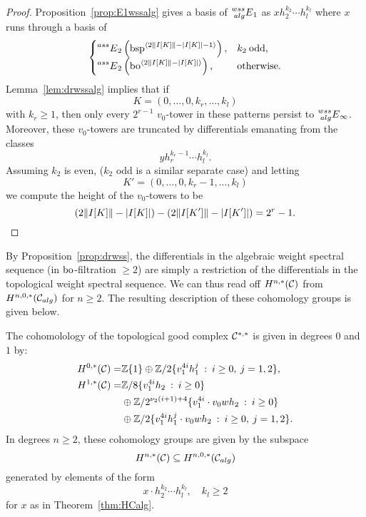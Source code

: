 {\begin{proof}
Proposition~\ref{prop:E1wssalg} gives a basis of $\prescript{wss}{alg}{E}_1$ as
$ xh_2^{k_2} \cdots h_l^{k_l} $
where $x$ runs through a basis of
$$
\begin{cases}
\prescript{ass}{}{E}_2\left(\mathrm{bsp}^{\langle 2\lVert I[K] \rVert-\lvert I[K] \rvert-1 \rangle}\right), &  k_2 \: \mathrm{odd}, \\
\prescript{ass}{}{E}_2\left( \mathrm{bo}^{\langle 2\lVert I[K] \rVert-\lvert I[K] \rvert \rangle} \right), & \mathrm{otherwise}.
\end{cases}
$$
Lemma~\ref{lem:drwssalg} implies that if 
$$ K = (0, \ldots, 0, k_r, \ldots, k_l) $$
with $k_r \ge 1$, then only every $2^{r-1}$ $v_0$-tower
in these patterns persist to $\prescript{wss}{alg}{E}_\infty$.  Moreover, these $v_0$-towers are truncated by differentials emanating from the classes
$$ y h_r^{k_r-1}\cdots h_l^{k_l}. $$
Assuming $k_2$ is even, ($k_2$ odd is a similar separate case) and letting 
$$ K' = (0, \ldots, 0, k_r-1, \ldots, k_l) $$
we compute the height of the $v_0$-towers to be
\[ (2\lVert I[K] \rVert-\lvert I[K] \rvert) - (2\lVert I[K'] \rVert-\lvert I[K'] \rvert) = 2^r-1. \qedhere\]
\end{proof}

By Proposition~\ref{prop:drwss}, the differentials in the algebraic weight spectral sequence (in $\mathrm{bo}$-filtration $\ge 2$) are simply a restriction of the differentials in the topological weight spectral sequence. We can thus read off $H^{n,*}(\mathcal{C})$ from $H^{n,0,*}(\mathcal{C}_{alg})$ for $n \ge 2$.  The resulting description of these cohomology groups is given below.


\begin{cor}\label{cor:HC}
The cohomolology of the topological good complex $\mathcal{C}^{*,*}$ is given in degrees $0$ and $1$ by:
\begin{align*}
H^{0,*}(\mathcal{C})  = & \mathbb{Z}\{1\} \oplus \mathbb{Z}/2\{v_1^{4i}h_1^j \: : \: i \ge 0, \: j = 1,2 \}, \\
H^{1,*}(\mathcal{C})  = & \mathbb{Z}/8 \{ v_1^{4i}h_2 \: : \: i \ge 0 \} \\
& \oplus 
\mathbb{Z}/2^{\nu_2(i+1)+4}\{ v_1^{4i} \cdot v_0wh_2 \: : \: i \ge 0 \} \\
& \oplus
\mathbb{Z}/2\{v_1^{4i}h_1^j \cdot v_0wh_2 \: : \: i \ge 0, \: j = 1,2 \}.
\end{align*}
In degrees $n \ge 2$, these cohomology groups are given by the subspace
$$ H^{n,*}(\mathcal{C}) \subseteq H^{n,0,*}(\mathcal{C}_{alg}) $$
generated by elements of the form
$$ x \cdot h_2^{k_2} \cdots h_l^{k_l}, \quad k_l \ge 2 $$
for $x$ as in Theorem~\ref{thm:HCalg}.
\end{cor}

}
